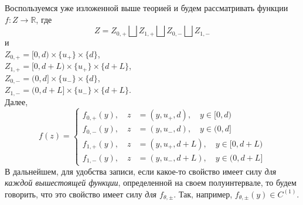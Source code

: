 \documentclass[12pt,a4paper]{article}
\begin{document}
Воспользуемся уже изложенной выше теорией и будем рассматривать функции $f: Z \to \mathbb{R}$, где 
\begin{equation*}
Z = Z_{0, +}\bigsqcup Z_{1, +}\bigsqcup Z_{0, -}\bigsqcup Z_{1, -}
\end{equation*}
и \\
$Z_{0, +} = [0, d) \times \{u_+\} \times \{d\} $, 
\\
$Z_{1, +} = [0, d + L) \times \{u_+\} \times \{d + L\} $,
\\ $Z_{0, -} = (0, d] \times \{u_-\} \times \{d\} $, 
\\
$Z_{1, -} = (0, d + L] \times \{u_-\} \times \{d + L\}$.\\
Далее,
\begin{equation*}
f(z) = \left\{ \begin{array}{cl}
f_{0, +} ( y ) , \quad z &= \left( y, u_+, d \right), \quad  y \in [0, d)\\
f_{0, -} ( y ) , \quad z &= \left( y, u_-, d \right), \quad  y \in (0, d] \\
f_{1, +} ( y ) , \quad z &= \left( y, u_+, d + L \right), \quad  y \in [0, d + L) \\
f_{1, -} ( y ) , \quad z &= \left( y, u_-, d + L \right), \quad  y \in (0, d + L] 
\end{array} \right.
\end{equation*}
В дальнейшем, для удобства записи, если какое-то свойство имеет силу \textit{для каждой вышестоящей функции}, определенной на своем полуинтервале, то будем говорить, что это свойство имеет силу \textit{для $f_{\theta, \pm}$}. Так, например, $f_{\theta, \pm} (y) \in C^{(1)}$.
\end{document}
